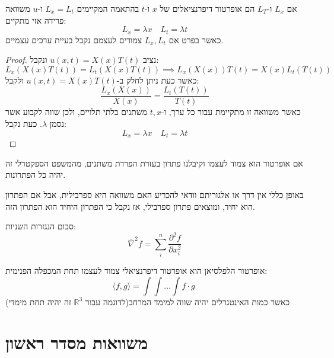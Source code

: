 \documentclass{tstextbook}
\begin{document}
\begin{proposition}
אם \(L_{x}\) ו-\(L_{T}\) הם אופרטור דיפרנציאלים של \(x\) ו-\(t\) בהתאמה המקיימים \(L_{x}=L_{t}\) ו-\(u\) משוואה פרידה אזי מתקיים:
$$L_{x}=\lambda x\quad L_{t}=\lambda t$$
כאשר בפרט אם \(L_{x},L_{t}\) צמודים לעצמם נקבל בעיית ערכים עצמיים.

\end{proposition}
\begin{proof}
נציב \(u(x,t)=X(x)T(t)\) ונקבל:
$$L_{x}(X(x)T(t))=L_{t}(X(x)T(t))\implies L_{x}(X(x))T(t)=X(x)L_{t}(T(t))$$
כאשר כעת ניתן לחלק ב-\(u(x,t)=X(x)T(t)\) ולקבל:
$$\frac{L_{x}(X(x))}{X(x)}=\frac{L_{t}(T(t))}{T(t)}$$
כאשר משוואה זו מתקיימת עבור כל ערך, ו-\(t,x\) משתנים בלתי תלויים, ולכן שווה לקבוע אשר נסמן \(\lambda\). כעת נקבל:
$$L_{x}=\lambda x\quad L_{t}=\lambda t$$

\end{proof}
\begin{corollary}
אם אופרטור הוא צמוד לעצמו וקיבלנו פתרון בעזרת הפרדת משתנים, מהמשפט הספקטרלי זה יהיה כל הפתרונות.

\end{corollary}
\begin{remark}
באופן כללי אין דרך או אלגוריתם וודאי להכריע האם משוואה היא ספרבילית, אבל אם הפתרון הוא יחיד, ומוצאים פתרון ספרבילי, אז נקבל כי הפתרון היחיד הוא הפתרון הזה.

\end{remark}
\begin{definition}[לפלאסיאן]
סכום הנגזרות השניות:
$$\bar{\nabla}^2 f=\sum_{i}^{n}\frac{\partial^{2} f}{\partial x_{i}^{2}} $$

\end{definition}
\begin{proposition}
אופרטור הלפלסיאן הוא אופרטור דיפרנציאלי צמוד לעצמו תחת המכפלה הפנימית:
$$\langle f,g \rangle = \int\int \dots \int f\cdot g\;$$
כאשר כמות האינטגרלים יהיה שווה למימד המרחב(לדוגמה עבור \(\mathbb{R}^{3}\) זה יהיה תחת מימדי)

\end{proposition}
\section{משוואות מסדר ראשון}
\end{document}
